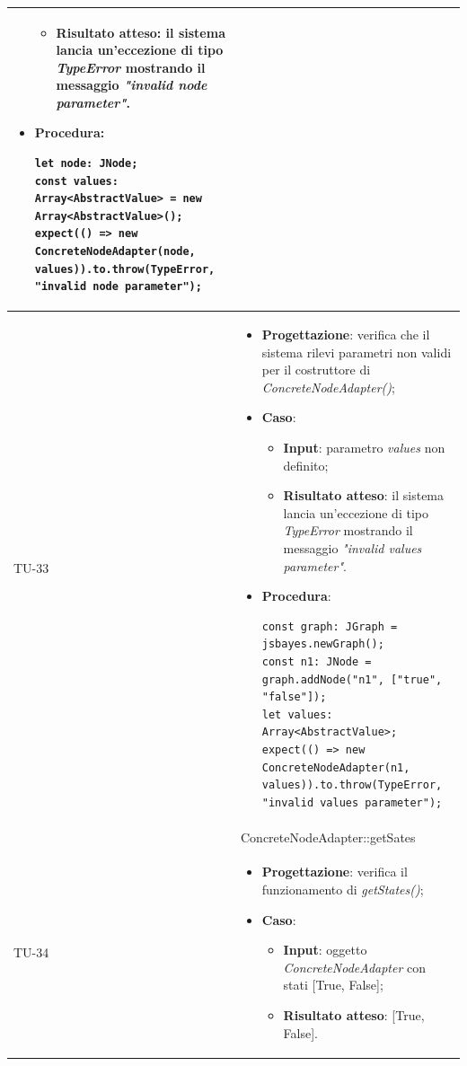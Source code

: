 \begin{longtable}{|C{1.5cm}|C{14.5cm}|}
\begin{itemize}
\begin{itemize}
			\item \textbf{Risultato atteso}: il sistema lancia un'eccezione di tipo \emph{TypeError} mostrando il messaggio \emph{"invalid node parameter"}.
		\end{itemize}
		\item \textbf{Procedura}:
		\begin{lstlisting}
let node: JNode;
const values: Array<AbstractValue> = new Array<AbstractValue>();
expect(() => new ConcreteNodeAdapter(node, values)).to.throw(TypeError, "invalid node parameter");
		\end{lstlisting}
	\end{itemize}\\
	\hline
	{TU-33} &  
	\begin{itemize}
		\item \textbf{Progettazione}: verifica che il sistema rilevi parametri non validi per il costruttore di \emph{ConcreteNodeAdapter()};
		\item \textbf{Caso}: 
		\begin{itemize}
			\item \textbf{Input}: parametro \emph{values} non definito;
			\item \textbf{Risultato atteso}: il sistema lancia un'eccezione di tipo \emph{TypeError} mostrando il messaggio \emph{"invalid values parameter"}.
		\end{itemize}
		\item \textbf{Procedura}:
		\begin{lstlisting}
const graph: JGraph = jsbayes.newGraph();
const n1: JNode = graph.addNode("n1", ["true", "false"]);
let values: Array<AbstractValue>;
expect(() => new ConcreteNodeAdapter(n1, values)).to.throw(TypeError, "invalid values parameter");	
		\end{lstlisting}
	\end{itemize}\\
	\hline
	 & ConcreteNodeAdapter::getSates\\
	\hline
	{TU-34} &
	\begin{itemize}
		\item \textbf{Progettazione}: verifica il funzionamento di \emph{getStates()};
		\item \textbf{Caso}: 
		\begin{itemize}
			\item \textbf{Input}: oggetto \emph{ConcreteNodeAdapter} con stati [True, False];
			\item \textbf{Risultato atteso}: [True, False].
		\end{itemize}

\end{itemize}
\end{longtable}
